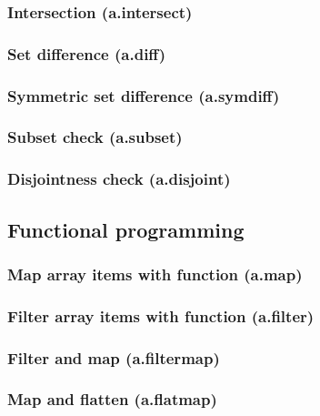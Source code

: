 \documentclass{article}
\theoremstyle{definition}
\begin{document}
\subsubsection{Intersection (a.intersect)}

\subsubsection{Set difference (a.diff)}

\subsubsection{Symmetric set difference (a.symdiff)}

\subsubsection{Subset check (a.subset)}

\subsubsection{Disjointness check (a.disjoint)}

\subsection{Functional programming}

\subsubsection{Map array items with function (a.map)}

\subsubsection{Filter array items with function (a.filter)}

\subsubsection{Filter and map (a.filtermap)}

\subsubsection{Map and flatten (a.flatmap)}
\end{document}
